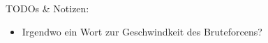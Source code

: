 TODOs \& Notizen:
\begin{itemize}
	\item Irgendwo ein Wort zur Geschwindkeit des Bruteforcens?
\end{itemize}